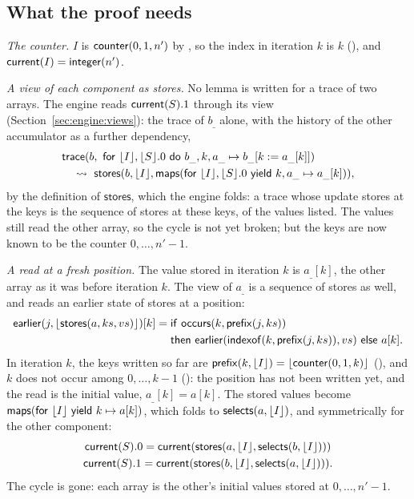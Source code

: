 \subsection{What the proof needs}
\emph{The counter.} $I$ is $\mathsf{counter}(0, 1, n')$ by , so the index in iteration $k$ is $k$
(), and $\mathsf{current}(I) = \mathsf{integer}(n')$.

\emph{A view of each component as stores.} No lemma is written for a trace of two arrays. The engine reads
$\mathsf{current}(S).1$ through its view (Section~\ref{sec:engine:views}): the trace of $b_\_$ alone, with the history of the
other accumulator as a further dependency,
\begin{align*}
  &\mathsf{trace}(b,\ \mathsf{for}\ \lfloor I\rfloor, \lfloor S\rfloor.0\ \mathsf{do}\ b_\_, k, a_\_ \mapsto b_\_[k := a_\_[k]])\\
  &\quad \leadsto\ \mathsf{stores}(b, \lfloor I\rfloor, \mathsf{maps}(\mathsf{for}\ \lfloor I\rfloor, \lfloor S\rfloor.0\ \mathsf{yield}\ k, a_\_ \mapsto a_\_[k])),
\end{align*}
by the definition of $\mathsf{stores}$, which the engine folds: a trace whose update stores at the keys is the
sequence of stores at these keys, of the values listed. The values still read the other array, so the cycle is
not yet broken; but the keys are now known to be the counter $0, \ldots, n' - 1$.

\emph{A read at a fresh position.} The value stored in iteration $k$ is $a_\_[k]$, the other array as it was
before iteration $k$. The view of $a_\_$ is a sequence of stores as well, and  reads an
earlier state of stores at a position:
\begin{align*}
  \mathsf{earlier}(j, \lfloor \mathsf{stores}(a, ks, vs)\rfloor)[k] = {}
  &\mathsf{if}\ \mathsf{occurs}(k, \mathsf{prefix}(j, ks))\\
  &\mathsf{then}\ \mathsf{earlier}(\mathsf{indexof}(k, \mathsf{prefix}(j, ks)), vs)\ \mathsf{else}\ a[k].
\end{align*}
In iteration $k$, the keys written so far are $\mathsf{prefix}(k, \lfloor I\rfloor) = \lfloor \mathsf{counter}(0, 1, k)\rfloor$
(), and $k$ does not occur among $0, \ldots, k - 1$ (): the
position has not been written yet, and the read is the initial value, $a_\_[k] = a[k]$. The stored values become
$\mathsf{maps}(\mathsf{for}\ \lfloor I\rfloor\ \mathsf{yield}\ k \mapsto a[k])$, which folds to $\mathsf{selects}(a, \lfloor I\rfloor)$, and symmetrically for the other
component:
\begin{gather*}
  \mathsf{current}(S).0 = \mathsf{current}(\mathsf{stores}(a, \lfloor I\rfloor, \mathsf{selects}(b, \lfloor I\rfloor)))\\
  \mathsf{current}(S).1 = \mathsf{current}(\mathsf{stores}(b, \lfloor I\rfloor, \mathsf{selects}(a, \lfloor I\rfloor))).
\end{gather*}
The cycle is gone: each array is the other's initial values stored at $0, \ldots, n' - 1$.

